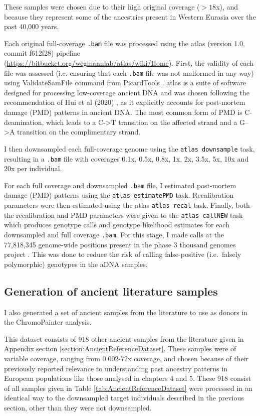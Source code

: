 These samples were chosen due to their high original coverage ($>18$x), and because they represent some of the ancestries present in Western Eurasia over the past 40,000 years.  

Each original full-coverage \texttt{.bam} file was processed using the atlas (version 1.0, commit f612f28) pipeline \cite{Link2017} \\(\url{https://bitbucket.org/wegmannlab/atlas/wiki/Home}). First, the validity of each file was assessed (i.e. ensuring that each \texttt{.bam} file was not malformed in any way) using ValidateSamFile command from PicardTools \cite{Picard2018toolkit}. atlas is a suite of software designed for processing low-coverage ancient DNA and was chosen following the recommendation of Hui et al (2020) \cite{hui2020evaluating}, as it explicitly accounts for post-mortem damage (PMD) patterns in ancient DNA. The most common form of PMD is C-deamination, which leads to a C->T transition on the affected strand and a G-->A transition on the complimentary strand.

I then downsampled each full-coverage genome using the \texttt{atlas downsample} task, resulting in a \texttt{.bam} file with coverages 0.1x, 0.5x, 0.8x, 1x, 2x, 3.5x, 5x, 10x and 20x per individual. 

For each full coverage and downsampled \texttt{.bam} file, I estimated post-mortem damage (PMD) patterns using the \texttt{atlas estimatePMD} task. Recalibration parameters were then estimated using the atlas \texttt{atlas recal} task. Finally, both the recalibration and PMD parameters were given to the \texttt{atlas callNEW} task which produces genotype calls and genotype likelihood estimates for each downsampled and full coverage \texttt{.bam}. For this stage, I made calls at the 77,818,345 genome-wide positions present in the phase 3 thousand genomes project \cite{1000GenomesProjectConsortium2015}. This was done to reduce the risk of calling false-positive (i.e.\ falsely polymorphic) genotypes in the aDNA samples.

\subsection{Generation of ancient literature samples} \label{AncientReferenceSamples}

I also generated a set of ancient samples from the literature to use as donors in the ChromoPainter analysis.

This dataset consists of 918 other ancient samples from the literature given in Appendix section \ref{section:AncientReferenceDataset}. These samples were of variable coverage, ranging from 0.002-72x coverage, and chosen because of their previously reported relevance to understanding past ancestry patterns in European populations like those analysed in chapters 4 and 5. These 918 consist of all samples given in Table \ref{tab:AncientReferenceDataset} were processed in an identical way to the downsampled target individuals described in the previous section, other than they were not downsampled.  

